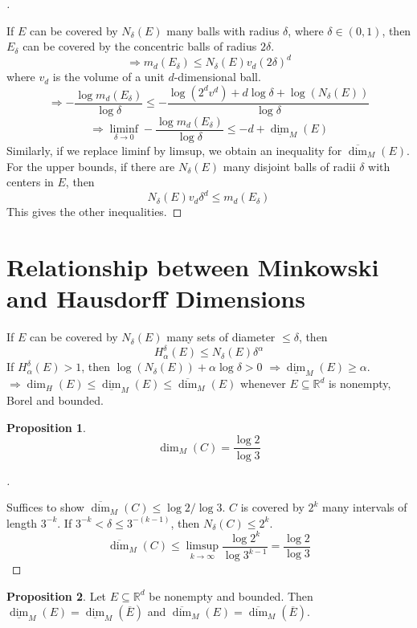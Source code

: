 \documentclass{article}
\theoremstyle{definition}
\newtheorem{prop}{Proposition}
\newenvironment{proofs}[1][\proofname]{%
  \begin{proof}[#1]$ $\par\nobreak\ignorespaces
}{%
  \end{proof}
}
\newcommand{\RR}{\mathbb R}
\newcommand{\Ra}{\Rightarrow}
\begin{document}
\begin{proofs}
	If $E$ can be covered by $N_\delta(E)$ many balls with radius $\delta$, where $\delta \in (0, 1)$, then $E_\delta$ can be covered by the concentric balls of radius $2 \delta$.
	\[
		\Ra m_d(E_\delta) \leq N_\delta(E) v_d (2 \delta)^d
	\]
	where $v_d$ is the volume of a unit $d$-dimensional ball.
	\[
		\Ra -\frac{\log m_d (E_\delta)}{\log \delta} \leq -\frac{\log (2^d v^d) + d \log \delta + \log (N_\delta(E))}{\log \delta}
	\]
	\[
		\Ra \liminf_{\delta \to 0} -\frac{\log m_d(E_\delta)}{\log \delta} \leq -d + \underline{\dim}_M(E)
	\]
	Similarly, if we replace liminf by limsup, we obtain an inequality for $\overline{\dim}_M(E)$.
	For the upper bounds, if there are $N_\delta(E)$ many disjoint balls of radii $\delta$ with centers in $E$, then 
	\[
		N_\delta(E) v_d \delta^d \leq m_d (E_\delta)
	\]
	This gives the other inequalities.
\end{proofs}

\section{Relationship between Minkowski and Hausdorff Dimensions}

If $E$ can be covered by $N_\delta(E)$ many sets of diameter $\leq \delta$, then
\[
	H_\alpha^\delta(E) \leq N_\delta(E) \delta^\alpha
\]
If $H_\alpha^\delta(E) > 1$, then $\log(N_\delta(E)) + \alpha \log \delta > 0$
$\Ra \underline{\dim}_M(E) \geq \alpha$.
$\Ra \dim_H(E) \leq \underline{\dim}_M(E) \leq \overline{\dim}_M(E)$ whenever $E \subseteq \RR^d$ is nonempty, Borel and bounded.

\begin{prop}
	\[
		\dim_M(C) = \frac{\log 2}{\log 3}
	\]
\end{prop}

\begin{proofs}
	Suffices to show $\overline{\dim}_M(C) \leq \log 2/\log 3$.
	$C$ is covered by $2^k$ many intervals of length $3^{-k}$.
	If $3^{-k} < \delta \leq 3^{-(k - 1)}$, then $N_\delta(C) \leq 2^k$.
	\[
		\overline{\dim}_M(C) \leq \limsup_{k \to \infty} \frac{\log 2^k}{\log 3^{k - 1}} = \frac{\log 2}{\log 3}
	\]
\end{proofs}

\begin{prop}
	Let $E \subseteq \RR^d$ be nonempty and bounded.
	Then $\underline{\dim}_M(E) = \underline{\dim}_M(\overline{E})$ and $\overline{\dim}_M(E) = \overline{\dim}_M(\overline{E})$.
\end{prop}
\end{document}
